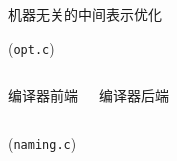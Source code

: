 \begin{frame}{}
  \begin{center}

    \vspace{0.50cm}
    机器无关的中间表示优化
  \end{center}
\end{frame}

\begin{frame}{}
  \begin{center}

    \pause
    \vspace{0.60cm}
    {(\texttt{opt.c})}
  \end{center}
\end{frame}

\begin{frame}{}
  \begin{columns}
      \begin{center}
        编译器前端
      \end{center}
      \begin{center}
        编译器后端
      \end{center}
  \end{columns}

  \pause
  \vspace{0.50cm}
  \centerline{(\texttt{naming.c})}
\end{frame}
